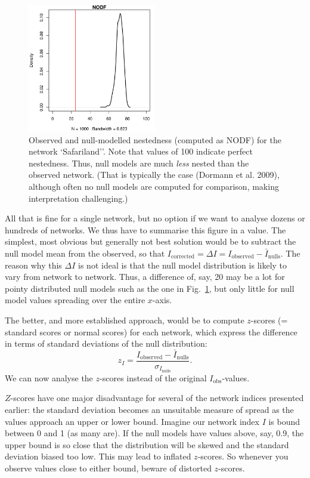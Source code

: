 \documentclass[a4paper, 11pt]{article}\usepackage[]{graphicx}\usepackage[]{color}
\newcommand{\ind}[1]{#1\index{#1}}           			   %
\begin{document}
\begin{figure}
\centering
\includegraphics[width=0.5\textwidth]{figures/NODFnull}
\caption{Observed and null-modelled nestedness (computed as NODF) for the network `Safariland''. Note that values of 100 indicate perfect nestedness. 
Thus, null models are much \emph{less} nested than the observed network. (That is typically the case (Dormann et al. 2009), although often no null models are computed for comparison, making interpretation challenging.)}
\label{fig:NODFnull}
\end{figure}
%
All that is fine for a single network, but no option if we want to analyse dozens or hundreds of networks. We thus have to summarise this figure in a value. The simplest, most obvious but generally not best solution would be to subtract the null model mean from the observed, so that $I_\text{corrected} = \Delta I= I_\text{observed} - \bar{I}_\text{nulls}$. The reason why this $\Delta I$ is not ideal is that the null model distribution is likely to vary from network to network. Thus, a difference of, say, 20 may be a lot for pointy distributed null models such as the one in Fig.~\ref{fig:NODFnull}, but only little for null model values spreading over the entire $x$-axis.

The better, and more established approach, would be to compute $z$-scores (= \ind{standard score}s or \ind{normal score}s) for each network, which express the difference in terms of standard deviations of the null distribution: 
\[z_I= \frac{I_\text{observed} - \bar{I}_\text{nulls}}{\sigma_{I_\text{nulls}}}.\] We can now analyse the $z$-scores instead of the original $I_\text{obs}$-values.

$Z$-scores have one major disadvantage for several of the network indices presented earlier: the standard deviation becomes an unsuitable measure of spread as the values approach an upper or lower bound. Imagine our network index $I$ is bound between 0 and 1 (as many are). If the null models have values above, say, 0.9, the upper bound is so close that the distribution will be skewed and the standard deviation biased too low. This may lead to inflated $z$-scores. So whenever you observe values close to either bound, beware of distorted $z$-scores.
\end{document}
